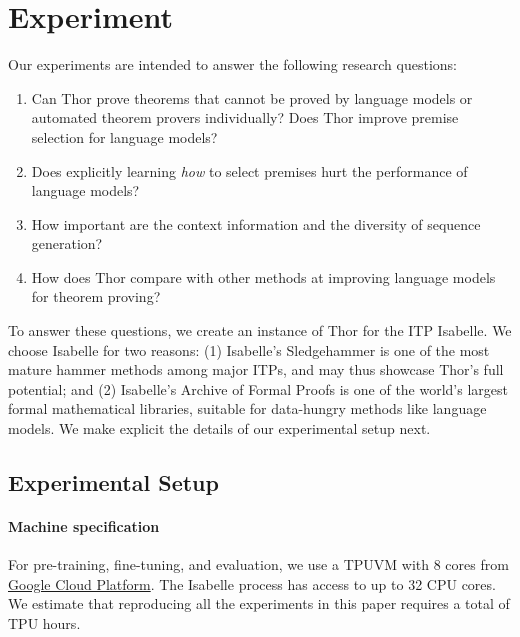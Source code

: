 \documentclass{article}
\begin{document}
 \section{Experiment}
\label{sec: exp}

Our experiments are intended to answer the following research questions:
\begin{enumerate}
    \item Can Thor prove theorems that cannot be proved by language models or automated theorem provers individually? Does Thor improve premise selection for language models?
\item Does explicitly learning \emph{how} to select premises hurt the performance of language models?
    \item How important are the context information and the diversity of sequence generation?
    \item How does Thor compare with other methods at improving language models for theorem proving?
\end{enumerate}
To answer these questions, we create an instance of Thor for the ITP Isabelle. We choose Isabelle for two reasons: (1) Isabelle's Sledgehammer is one of the most mature hammer methods among major ITPs, and may thus showcase Thor's full potential; and (2) Isabelle's Archive of Formal Proofs is one of the world's largest formal mathematical libraries, suitable for data-hungry methods like language models. We make explicit the details of our experimental setup next.

\subsection{Experimental Setup}
\label{subsec: thor/isa}
\paragraph{Machine specification}
For pre-training, fine-tuning, and evaluation, we use a TPUVM with 8 cores from \href{https://cloud.google.com/tpu?hl=en}{Google Cloud Platform}.
The Isabelle process has access to up to 32 CPU cores. We estimate that reproducing all the experiments in this paper requires a total of  TPU hours.
\end{document}
